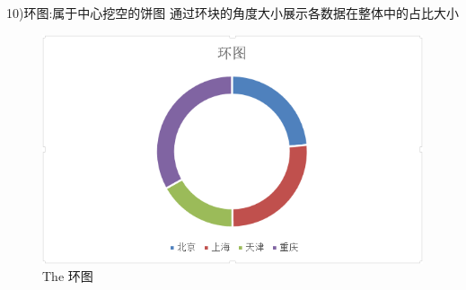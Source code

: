 \documentclass{article}
\begin{document}
\begin{itemize}
\begin{figure}[h!]
    			\label{fig:bingtu}
    		\end{figure}
    		10)环图:属于中心挖空的饼图
    		通过环块的角度大小展示各数据在整体中的占比大小\par
    		\begin{figure}[h!]
    			\centering
    			\includegraphics[scale=0.7]{huan}
    			\caption{The 环图}
    			\label{fig:huantu}
    		\end{figure}
    	

\end{itemize}
\end{document}
